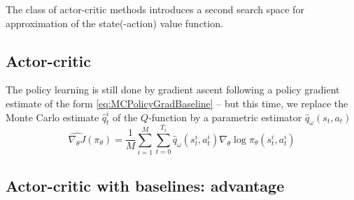 \documentclass[12pt]{report}
\begin{document}
The class of actor-critic methods introduces a second search space for approximation of the state(-action) value function.


\subsection{Actor-critic}


The policy learning is still done by gradient ascent following a policy gradient estimate of the form \cref{eq:MCPolicyGradBaseline} -- but this time, we replace the Monte Carlo estimate $\hat{q}^i_t$ of the $Q$-function by a parametric estimator $\hat{q}_\omega(s_t, a_t)$
\[
	\widehat{\nabla_\theta J}(\pi_\theta) =
	\frac{1}{M}\sum_{i=1}^M
	\sum_{t=0}^{T_i} \hat{q}_\omega(s^i_t,a^i_t)
	\nabla_\theta \log\pi_\theta(s^i_t, a^i_t)
\]

\subsection{Actor-critic with baselines: advantage}



\nocite{*}
\printbibliography
\end{document}
